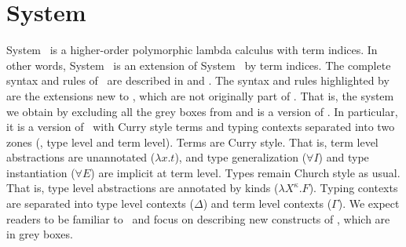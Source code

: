 \section{System \Fi}
\label{sec:Fi}
System \Fi\ is a higher-order polymorphic lambda calculus with term indices.
In other words, System \Fi\ is an extension of System \Fw\ by term indices.
The complete syntax and rules of \Fi\ are described in  and
. The syntax and rules highlighted by 
are the extensions new to \Fi, which are not originally part of \Fw.
That is, the system we obtain by excluding all the grey boxes from 
and  is a version of \Fw. In particular, it is a version of \Fw\
with Curry style terms and typing contexts separated into two zones
(\ie, type level and term level). Terms are Curry style. That is,
term level abstractions are unannotated ($\lambda x.t$), and
type generalization ($\forall I$) and type instantiation ($\forall E$) are
implicit at term level. Types remain Church style as usual. That is,
type level abstractions are annotated by kinds ($\lambda X^\kappa.F$).
Typing contexts are separated into type level contexts ($\Delta$) and
term level contexts ($\Gamma$). We expect readers to be familiar to \Fw\
and focus on describing new constructs of \Fi, which are in grey boxes.

